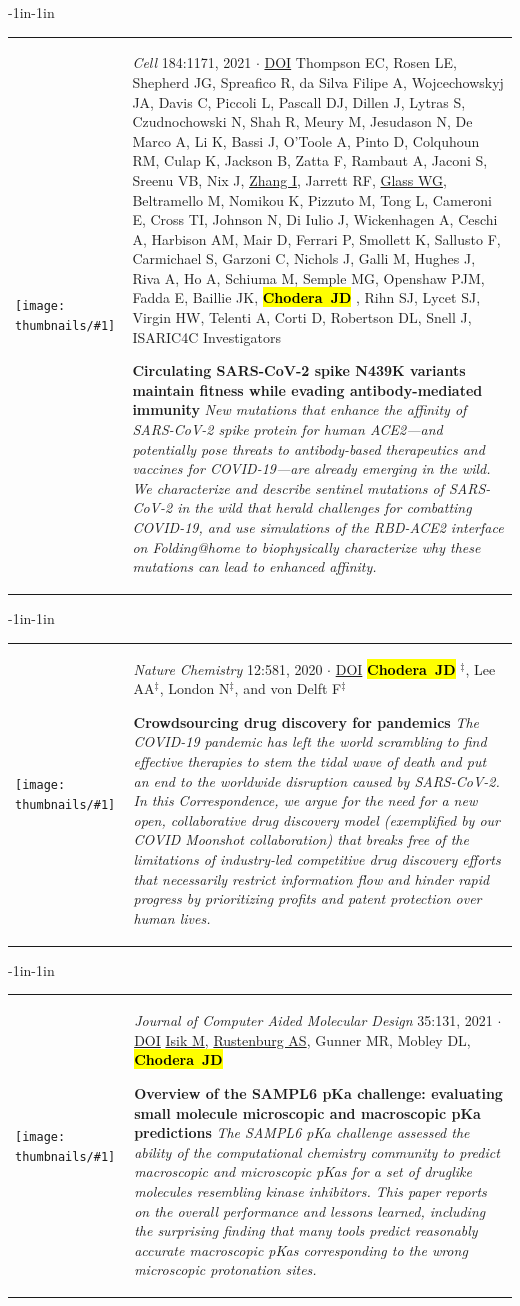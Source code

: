 \documentclass[10pt]{article}
\newcommand{\newarticle}[7]{
\begin{adjustwidth}{-1in}{-1in}  
\begin{tabular}{p{0.9in}p{7in}}
\parbox[c]{0.9in}{\texttt{[image: thumbnails/\#1]}} & \parbox[c]{6in}{\setstretch{0.9} {\small #4} $\cdot$ \href{#6}{#5} \\ {\footnotesize {#2}} \\ \raggedright { \bf\nohyphens{#3}}  \\ {\footnotesize\emph {#7}}} %
\end{tabular}
\end{adjustwidth}
\vspace{0.2in}
}
\newcommand{\jdc}{ {\bf \hl{Chodera~JD}} } %
\begin{document}
\newarticle{vir-cell-xray.jpg}{Thompson EC, Rosen LE, Shepherd JG, Spreafico R, da Silva Filipe A, Wojcechowskyj JA, Davis C, Piccoli L, Pascall DJ, Dillen J, Lytras S, Czudnochowski N, Shah R, Meury M, Jesudason N, De Marco A, Li K, Bassi J, O'Toole A, Pinto D, Colquhoun RM, Culap K, Jackson B, Zatta F, Rambaut A, Jaconi S, Sreenu VB, Nix J, \underline{Zhang I}, Jarrett RF, \underline{Glass WG}, Beltramello M, Nomikou K, Pizzuto M, Tong L, Cameroni E, Cross TI, Johnson N, Di Iulio J, Wickenhagen A, Ceschi A, Harbison AM, Mair D, Ferrari P, Smollett K, Sallusto F, Carmichael S, Garzoni C, Nichols J, Galli M, Hughes J, Riva A, Ho A, Schiuma M, Semple MG, Openshaw PJM, Fadda E, Baillie JK, \jdc, Rihn SJ, Lycet SJ, Virgin HW, Telenti A, Corti D, Robertson DL, Snell J, ISARIC4C Investigators}{Circulating SARS-CoV-2 spike N439K variants maintain fitness while evading antibody-mediated immunity}{\emph{Cell} 184:1171, 2021}{DOI}{https://doi.org/10.1016/j.cell.2021.01.037}{New mutations that enhance the affinity of SARS-CoV-2 spike protein for human ACE2—and potentially pose threats to antibody-based therapeutics and vaccines for COVID-19—are already emerging in the wild. We characterize and describe sentinel mutations of SARS-CoV-2 in the wild that herald challenges for combatting COVID-19, and use simulations of the RBD-ACE2 interface on Folding@home to biophysically characterize why these mutations can lead to enhanced affinity.}

\newarticle{covid-moonshot-logo-small}{\jdc$^\ddag$, Lee AA$^\ddag$, London N$^\ddag$, and von Delft F$^\ddag$}{Crowdsourcing drug discovery for pandemics}{\emph{Nature Chemistry} 12:581, 2020}{DOI}{https://doi.org/10.1038/s41557-020-0496-2}{The COVID-19 pandemic has left the world scrambling to find effective therapies to stem the tidal wave of death and put an end to the worldwide disruption caused by SARS-CoV-2. In this Correspondence, we argue for the need for a new open, collaborative drug discovery model (exemplified by our COVID Moonshot collaboration) that breaks free of the limitations of industry-led competitive drug discovery efforts that necessarily restrict information flow and hinder rapid progress by prioritizing profits and patent protection over human lives.}

\newarticle{sampl6-pKa-assessment}{\underline{Isik M}, \underline{Rustenburg AS}, Gunner MR, Mobley DL, \jdc}{Overview of the SAMPL6 pKa challenge: evaluating small molecule microscopic and macroscopic pKa predictions}{\emph{Journal of Computer Aided Molecular Design} 35:131, 2021}{DOI}{https://doi.org/10.1007/s10822-020-00362-6}{The SAMPL6 pKa challenge assessed the ability of the computational chemistry community to predict macroscopic and microscopic pKas for a set of druglike molecules resembling kinase inhibitors. This paper reports on the overall performance and lessons learned, including the surprising finding that many tools predict reasonably accurate macroscopic pKas corresponding to the wrong microscopic protonation sites.}
\end{document}
